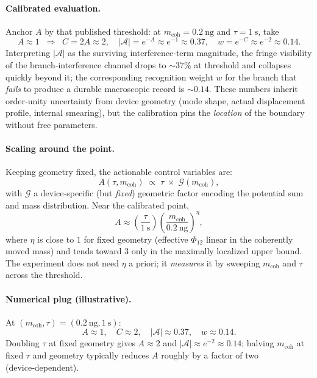 \documentclass[11pt,letterpaper]{article}
\begin{document}
\paragraph{Calibrated evaluation.}
Anchor $A$ by that published threshold: at $m_{\mathrm{coh}}=0.2~\mathrm{ng}$ and $\tau=1~\mathrm{s}$, take
\[
A \approx 1\;\;\Rightarrow\;\; C=2A\approx 2,\quad 
|\mathcal A|=e^{-A}\approx e^{-1}\approx 0.37,\quad 
w=e^{-C}\approx e^{-2}\approx 0.14.
\]
Interpreting $|\mathcal A|$ as the surviving interference‑term magnitude, the fringe visibility of the branch‑interference channel drops to $\sim 37\%$ at threshold and collapses quickly beyond it; the corresponding recognition weight $w$ for the branch that \emph{fails} to produce a durable macroscopic record is $\sim 0.14$. These numbers inherit order‑unity uncertainty from device geometry (mode shape, actual displacement profile, internal smearing), but the calibration pins the \emph{location} of the boundary without free parameters. %

\paragraph{Scaling around the point.}
Keeping geometry fixed, the actionable control variables are:
\[
A(\tau,m_{\mathrm{coh}})\;\propto\;\tau\;\times\;\mathcal G(m_{\mathrm{coh}}),
\]
with $\mathcal G$ a device‑specific (but \emph{fixed}) geometric factor encoding the potential sum and mass distribution. Near the calibrated point, 
\[
A\approx \left(\frac{\tau}{1~\mathrm{s}}\right)\!\left(\frac{m_{\mathrm{coh}}}{0.2~\mathrm{ng}}\right)^{\!\eta},
\]
where $\eta$ is close to $1$ for fixed geometry (effective $\Phi_{12}$ linear in the coherently moved mass) and tends toward $3$ only in the maximally localized upper bound. The experiment does not need $\eta$ a priori; it \emph{measures} it by sweeping $m_{\mathrm{coh}}$ and $\tau$ across the threshold. %

\paragraph{Numerical plug (illustrative).} 
At $(m_{\mathrm{coh}},\tau)=(0.2~\mathrm{ng},1~\mathrm{s})$:
\[
A\approx 1,\quad C\approx 2,\quad 
|\mathcal A|\approx 0.37,\quad
w\approx 0.14.
\]
Doubling $\tau$ at fixed geometry gives $A\approx 2$ and $|\mathcal A|\approx e^{-2}\approx 0.14$; halving $m_{\mathrm{coh}}$ at fixed $\tau$ and geometry typically reduces $A$ roughly by a factor of two (device‑dependent). %
\end{document}

